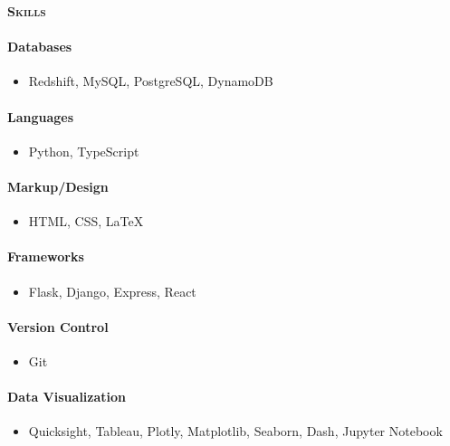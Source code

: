 \documentclass[11pt, a4paper]{article}
\newcommand{\headleft}[1]{\vspace*{3ex}\textsc{\textbf{#1}}\par%
    \vspace*{-1.5ex}\hrulefill\par\vspace*{0.7ex}}
\begin{document}
\begin{minipage}[t]{0.33\textwidth}
{\begin{minipage}[t][293mm][t]{0.82\textwidth}
\headleft{Skills}
\vspace{-20pt}
\paragraph[*]{Databases}
\begin{itemize}
\item Redshift, MySQL, PostgreSQL, DynamoDB
\end{itemize} 
\vspace{-18pt}
\paragraph[*]{Languages}
\begin{itemize}
\item Python, TypeScript
\end{itemize} 
\vspace{-18pt}
\paragraph[*]{Markup/Design}
\begin{itemize}
\item HTML, CSS, \LaTeX
\end{itemize}
\vspace{-18pt}
\paragraph[*]{Frameworks}
\begin{itemize}
\item Flask, Django, Express, React
\end{itemize}
\vspace{-18pt}
\paragraph[*]{Version Control}
\begin{itemize}
\item Git
\end{itemize} 
\vspace{-18pt}
\paragraph[*]{Data Visualization}
\begin{itemize}
\item Quicksight, Tableau, Plotly, Matplotlib, Seaborn, Dash, Jupyter Notebook
\end{itemize}
\end{minipage}%
\textwidth\relax%
}
\end{minipage}%
\end{document}
